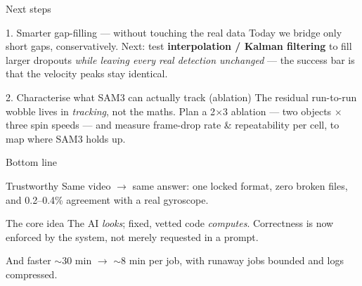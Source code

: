 \documentclass[10pt,aspectratio=169]{beamer}
\newcommand{\gd}[1]{\textcolor{good}{#1}}
\begin{document}
\begin{frame}{Next steps}
\begin{block}{1. Smarter gap-filling --- without touching the real data}
\footnotesize Today we bridge only short gaps, conservatively. Next: test \textbf{interpolation / Kalman filtering} to fill larger dropouts \emph{while leaving every real detection unchanged} --- the success bar is that the velocity \gd{peaks stay identical}.
\end{block}
\begin{block}{2. Characterise what SAM3 can actually track (ablation)}
\footnotesize The residual run-to-run wobble lives in \emph{tracking}, not the maths. Plan a 2$\times$3 ablation --- two objects $\times$ three spin speeds --- and measure frame-drop rate \& repeatability per cell, to map where SAM3 holds up.
\end{block}
\centering
{}
\end{frame}

\begin{frame}{Bottom line}
\begin{block}{Trustworthy}
Same video $\to$ same answer: one locked format, zero broken files, and \gd{0.2--0.4\%} agreement with a real gyroscope.
\end{block}
\begin{block}{The core idea}
The AI \emph{looks}; fixed, vetted code \emph{computes}. Correctness is now \gd{enforced by the system}, not merely requested in a prompt.
\end{block}
\begin{block}{And faster}
$\sim$30 min $\to$ $\sim$8 min per job, with runaway jobs bounded and logs compressed.
\end{block}
\end{frame}
\end{document}
